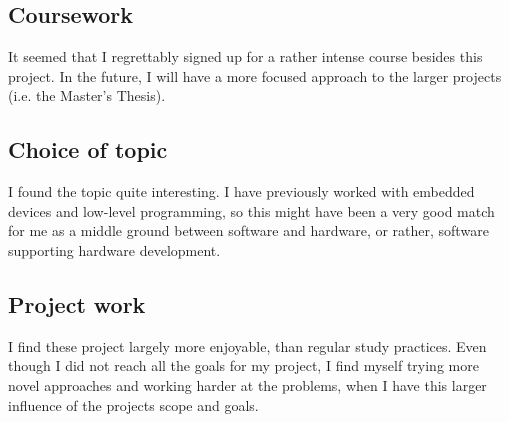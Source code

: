\documentclass[a4paper, english]{article}
\numberwithin{equation}{section}
\begin{document}
\subsection{Coursework}
It seemed that I regrettably signed up for a rather intense course besides this project. In the future, I will have a more focused approach to the larger projects (i.e. the Master’s Thesis).
\subsection{Choice of topic}
I found the topic quite interesting. I have previously worked with embedded devices and low-level programming, so this might have been a very good match for me as a middle ground between software and hardware, or rather, software supporting hardware development.
\subsection{Project work}
I find these project largely more enjoyable, than regular study practices. Even though I did not reach all the goals for my project, I find myself trying more novel approaches and working harder at the problems, when I have this larger influence of the projects scope and goals.

%
%




%
\end{document}
